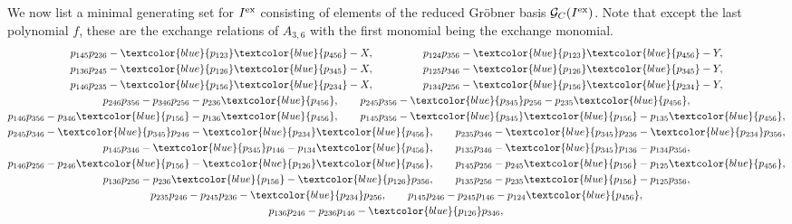 \documentclass[10pt,a4paper]{amsart}
\numberwithin{equation}{section}
\begin{document}
\medskip
{}
We now list a minimal generating set for $I^{\rm ex}$
consisting of elements of the reduced Gr\"obner basis $\mathcal G_C(I^{\rm ex})$. Note that except the last polynomial $f$, these are the exchange relations of $A_{3,6}$ with the first monomial being the exchange monomial.
\begin{gather*}
 p_{145}p_{236} - \textcolor{blue}{p_{123}}\textcolor{blue}{p_{456}} - X,\qquad\qquad\ \
 p_{124}p_{356} - \textcolor{blue}{p_{123}}\textcolor{blue}{p_{456}} - Y,
\\
 p_{136}p_{245} - \textcolor{blue}{p_{126}}\textcolor{blue}{p_{345}} - X,\qquad\qquad\ \
 p_{125}p_{346} - \textcolor{blue}{p_{126}}\textcolor{blue}{p_{345}} - Y,
\\
 p_{146}p_{235} - \textcolor{blue}{p_{156}}\textcolor{blue}{p_{234}} - X,\qquad\qquad\ \
 p_{134}p_{256} - \textcolor{blue}{p_{156}}\textcolor{blue}{p_{234}} - Y,
\\
 p_{246}p_{356} - p_{346}p_{256} - p_{236}\textcolor{blue}{p_{456}},\qquad
 p_{245}p_{356} - \textcolor{blue}{p_{345}}p_{256} - p_{235}\textcolor{blue}{p_{456}},
\\
 p_{146}p_{356} - p_{346}\textcolor{blue}{p_{156}} - p_{136}\textcolor{blue}{p_{456}},\qquad
 p_{145}p_{356} - \textcolor{blue}{p_{345}}\textcolor{blue}{p_{156}} - p_{135}\textcolor{blue}{p_{456}},
\\
 p_{245}p_{346} - \textcolor{blue}{p_{345}}p_{246} - \textcolor{blue}{p_{234}}\textcolor{blue}{p_{456}},\qquad
 p_{235}p_{346} - \textcolor{blue}{p_{345}}p_{236} - \textcolor{blue}{p_{234}}p_{356},
\\
 p_{145}p_{346} - \textcolor{blue}{p_{345}}p_{146} - p_{134}\textcolor{blue}{p_{456}},\qquad
 p_{135}p_{346} - \textcolor{blue}{p_{345}}p_{136} - p_{134}p_{356},
\\
 p_{146}p_{256} - p_{246}\textcolor{blue}{p_{156}} - \textcolor{blue}{p_{126}}\textcolor{blue}{p_{456}},\qquad
 p_{145}p_{256} - p_{245}\textcolor{blue}{p_{156}} - p_{125}\textcolor{blue}{p_{456}},
\\
 p_{136}p_{256} - p_{236}\textcolor{blue}{p_{156}} - \textcolor{blue}{p_{126}}p_{356},\qquad
 p_{135}p_{256} - p_{235}\textcolor{blue}{p_{156}} - p_{125}p_{356},
\\
 p_{235}p_{246} - p_{245}p_{236} - \textcolor{blue}{p_{234}}p_{256},\qquad
 p_{145}p_{246} - p_{245}p_{146} - p_{124}\textcolor{blue}{p_{456}},
\\
 p_{136}p_{246} - p_{236}p_{146} - \textcolor{blue}{p_{126}}p_{346},\qquad

\end{gather*}
\end{document}
